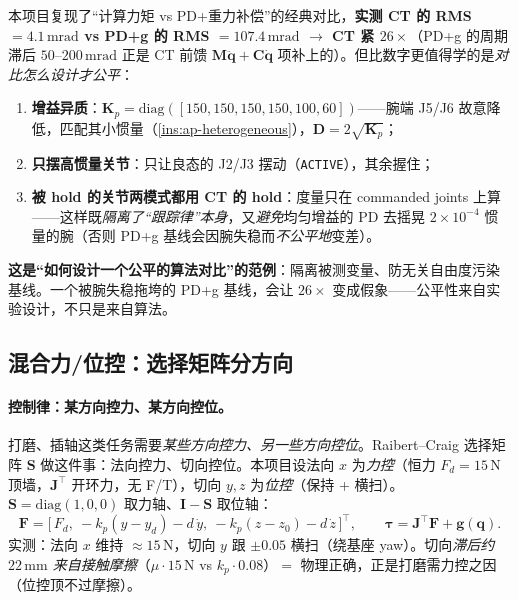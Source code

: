 \begin{insight}\label{ins:ap-fair-compare}
本项目复现了“计算力矩 vs PD+重力补偿”的经典对比，\textbf{实测 CT 的 RMS $=4.1\,\mathrm{mrad}$ vs PD+g 的 RMS $=107.4\,\mathrm{mrad}$ $\to$ CT 紧 $26\times$}（PD+g 的周期滞后 $50$--$200\,\mathrm{mrad}$ 正是 CT 前馈 $\mathbf{M}\ddot{\mathbf{q}}+\mathbf{C}\dot{\mathbf{q}}$ 项补上的）。但比数字更值得学的是\emph{对比怎么设计才公平}：
\begin{enumerate}
  \item \textbf{增益异质}：$\mathbf{K}_p=\mathrm{diag}([150,150,150,150,100,60])$——腕端 J5/J6 故意降低，匹配其小惯量（\cref{ins:ap-heterogeneous}），$\mathbf{D}=2\sqrt{\mathbf{K}_p}$；
  \item \textbf{只摆高惯量关节}：只让良态的 J2/J3 摆动（\texttt{ACTIVE}），其余握住；
  \item \textbf{被 hold 的关节两模式都用 CT 的 hold}：度量只在 commanded joints 上算——这样既\emph{隔离了“跟踪律”本身}，又\emph{避免}均匀增益的 PD 去摇晃 $2\times10^{-4}$ 惯量的腕（否则 PD+g 基线会因腕失稳而\emph{不公平地}变差）。
\end{enumerate}
\textbf{这是“如何设计一个公平的算法对比”的范例}：隔离被测变量、防无关自由度污染基线。一个被腕失稳拖垮的 PD+g 基线，会让 $26\times$ 变成假象——公平性来自实验设计，不只是来自算法。
\end{insight}

\subsection{混合力/位控：选择矩阵分方向}
\label{sec:ap-hybrid}

\paragraph{控制律：某方向控力、某方向控位。}
打磨、插轴这类任务需要\emph{某些方向控力、另一些方向控位}。Raibert--Craig 选择矩阵 $\mathbf{S}$ 做这件事\cite{raibert1981hybrid}：法向控力、切向控位。本项目设法向 $x$ 为\emph{力控}（恒力 $F_d=15\,\mathrm{N}$ 顶墙，$\mathbf{J}^\top$ 开环力，无 F/T），切向 $y,z$ 为\emph{位控}（保持 + 横扫）。$\mathbf{S}=\mathrm{diag}(1,0,0)$ 取力轴、$\mathbf{I}-\mathbf{S}$ 取位轴：
\begin{equation}
  \mathbf{F}=\big[\,F_d,\ -k_p(y-y_d)-d\,\dot y,\ -k_p(z-z_0)-d\,\dot z\,\big]^\top,\qquad
  \boldsymbol{\tau}=\mathbf{J}^\top\mathbf{F}+\mathbf{g}(\mathbf{q}).
  \label{eq:ap-hybrid}
\end{equation}
实测：法向 $x$ 维持 $\approx 15\,\mathrm{N}$，切向 $y$ 跟 $\pm0.05$ 横扫（绕基座 yaw）。切向\emph{滞后约 $22\,\mathrm{mm}$ 来自接触摩擦}（$\mu\cdot 15\,\mathrm{N}$ vs $k_p\cdot 0.08$）$=$ 物理正确，正是打磨需力控之因（位控顶不过摩擦）。

